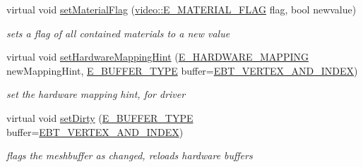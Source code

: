 \begin{DoxyCompactItemize}
\mbox{\label{structirr_1_1scene_1_1SMesh_a0ca30440aef6ca66dfc177b2a0e41e52}} 
virtual void \hyperlink{structirr_1_1scene_1_1SMesh_a0ca30440aef6ca66dfc177b2a0e41e52}{set\+Material\+Flag} (\hyperlink{namespaceirr_1_1video_a8a3bc00ae8137535b9fbc5f40add70d3}{video\+::\+E\+\_\+\+M\+A\+T\+E\+R\+I\+A\+L\+\_\+\+F\+L\+AG} flag, bool newvalue)
\begin{DoxyCompactList}\small\item\em sets a flag of all contained materials to a new value \end{DoxyCompactList}\item 
\mbox{\label{structirr_1_1scene_1_1SMesh_a79839b08062bfcd283e441056bf846e6}} 
virtual void \hyperlink{structirr_1_1scene_1_1SMesh_a79839b08062bfcd283e441056bf846e6}{set\+Hardware\+Mapping\+Hint} (\hyperlink{namespaceirr_1_1scene_ac7d8ee8d77da75f2580bb9bb17231c27}{E\+\_\+\+H\+A\+R\+D\+W\+A\+R\+E\+\_\+\+M\+A\+P\+P\+I\+NG} new\+Mapping\+Hint, \hyperlink{namespaceirr_1_1scene_a8f59a89ffef0ad8e5b2c2cb874a93e8c}{E\+\_\+\+B\+U\+F\+F\+E\+R\+\_\+\+T\+Y\+PE} buffer=\hyperlink{namespaceirr_1_1scene_a8f59a89ffef0ad8e5b2c2cb874a93e8ca34ea664123fbc28610408e51b014dcdd}{E\+B\+T\+\_\+\+V\+E\+R\+T\+E\+X\+\_\+\+A\+N\+D\+\_\+\+I\+N\+D\+EX})
\begin{DoxyCompactList}\small\item\em set the hardware mapping hint, for driver \end{DoxyCompactList}\item 
\mbox{\label{structirr_1_1scene_1_1SMesh_a3ffa0e6294be831ca5be6e6ff9829ca9}} 
virtual void \hyperlink{structirr_1_1scene_1_1SMesh_a3ffa0e6294be831ca5be6e6ff9829ca9}{set\+Dirty} (\hyperlink{namespaceirr_1_1scene_a8f59a89ffef0ad8e5b2c2cb874a93e8c}{E\+\_\+\+B\+U\+F\+F\+E\+R\+\_\+\+T\+Y\+PE} buffer=\hyperlink{namespaceirr_1_1scene_a8f59a89ffef0ad8e5b2c2cb874a93e8ca34ea664123fbc28610408e51b014dcdd}{E\+B\+T\+\_\+\+V\+E\+R\+T\+E\+X\+\_\+\+A\+N\+D\+\_\+\+I\+N\+D\+EX})
\begin{DoxyCompactList}\small\item\em flags the meshbuffer as changed, reloads hardware buffers \end{DoxyCompactList}\end{DoxyCompactItemize}
